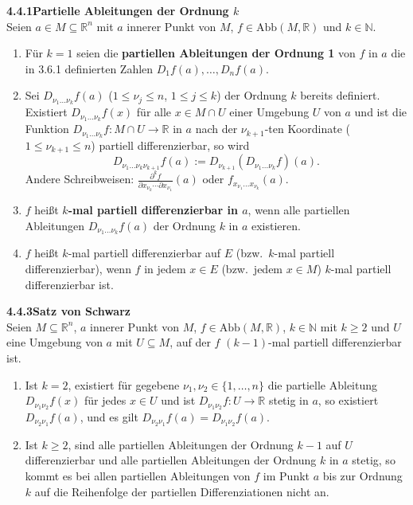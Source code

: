 \documentclass[a4paper,12pt]{article}
\newcommand{\gentry}[3]{%
  \noindent\textbf{#1\quad #2}\nopagebreak\\[0.2em]
  #3\par\smallskip
}
\begin{document}
\gentry{4.4.1}{Partielle Ableitungen der Ordnung $k$}{%
  Seien $a \in M \subseteq \mathbb{R}^n$ mit $a$ innerer Punkt von $M$,
  $f \in \mathrm{Abb}(M, \mathbb{R})$ und $k \in \mathbb{N}$.
  \begin{enumerate}[label=(\roman*),topsep=2pt,itemsep=1pt]
    \item Für $k = 1$ seien die \textbf{partiellen Ableitungen der Ordnung 1} von $f$ in $a$
          die in 3.6.1 definierten Zahlen $D_1 f(a), \ldots, D_n f(a)$.
    \item Sei $D_{\nu_1 \ldots \nu_k} f(a)$ ($1 \leq \nu_j \leq n$, $1 \leq j \leq k$) der
          Ordnung $k$ bereits definiert. Existiert $D_{\nu_1 \ldots \nu_k} f(x)$ für alle
          $x \in M \cap U$ einer Umgebung $U$ von $a$ und ist die Funktion
          $D_{\nu_1 \ldots \nu_k} f: M \cap U \to \mathbb{R}$ in $a$ nach der $\nu_{k+1}$-ten
          Koordinate ($1 \leq \nu_{k+1} \leq n$) partiell differenzierbar, so wird
          \[
            D_{\nu_1 \ldots \nu_k \nu_{k+1}} f(a) := D_{\nu_{k+1}} (D_{\nu_1 \ldots \nu_k} f)(a).
          \]
          Andere Schreibweisen: $\displaystyle \frac{\partial^k f}{\partial x_{\nu_k} \cdots \partial x_{\nu_1}}(a)$
          oder $f_{x_{\nu_1} \ldots x_{\nu_k}}(a)$.
    \item $f$ heißt \textbf{$k$-mal partiell differenzierbar in $a$}, wenn alle partiellen
          Ableitungen $D_{\nu_1 \ldots \nu_k} f(a)$ der Ordnung $k$ in $a$ existieren.
    \item $f$ heißt $k$-mal partiell differenzierbar auf $E$ (bzw.\ $k$-mal partiell
          differenzierbar), wenn $f$ in jedem $x \in E$ (bzw.\ jedem $x \in M$) $k$-mal partiell
          differenzierbar ist.
  \end{enumerate}
}

\gentry{4.4.3}{Satz von Schwarz}{%
  Seien $M \subseteq \mathbb{R}^n$, $a$ innerer Punkt von $M$, $f \in \mathrm{Abb}(M, \mathbb{R})$,
  $k \in \mathbb{N}$ mit $k \geq 2$ und $U$ eine Umgebung von $a$ mit $U \subseteq M$,
  auf der $f$ $(k-1)$-mal partiell differenzierbar ist.
  \begin{enumerate}[label=(\roman*),topsep=2pt,itemsep=1pt]
    \item Ist $k = 2$, existiert für gegebene $\nu_1, \nu_2 \in \{1, \ldots, n\}$ die partielle
          Ableitung $D_{\nu_1 \nu_2} f(x)$ für jedes $x \in U$ und ist $D_{\nu_1 \nu_2} f: U \to \mathbb{R}$
          stetig in $a$, so existiert $D_{\nu_2 \nu_1} f(a)$, und es gilt
          $D_{\nu_2 \nu_1} f(a) = D_{\nu_1 \nu_2} f(a)$.
    \item Ist $k \geq 2$, sind alle partiellen Ableitungen der Ordnung $k-1$ auf $U$ differenzierbar
          und alle partiellen Ableitungen der Ordnung $k$ in $a$ stetig, so kommt es bei allen
          partiellen Ableitungen von $f$ im Punkt $a$ bis zur Ordnung $k$ auf die Reihenfolge
          der partiellen Differenziationen nicht an.
  \end{enumerate}
}
\end{document}
